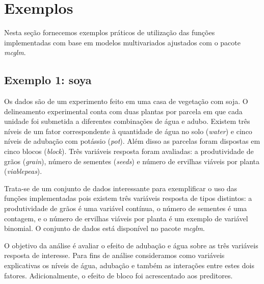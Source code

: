 
\section{Exemplos}

Nesta seção fornecemos exemplos práticos de utilização das funções implementadas com base em modelos multivariados ajustados com o pacote \emph{mcglm}.

\subsection{Exemplo 1: soya}

Os dados são de um experimento feito em uma casa de vegetação com soja. O delineamento experimental conta com duas plantas por parcela em que cada unidade foi submetida a diferentes combinações de água e adubo. Existem três níveis de um fator correspondente à quantidade de água no solo (\emph{water}) e cinco níveis de adubação com potássio (\emph{pot}). Além disso as parcelas foram dispostas em cinco blocos (\emph{block}). Três variáveis resposta foram avaliadas: a produtividade de grãos (\emph{grain}), número de sementes (\emph{seeds}) e número de ervilhas viáveis por planta (\emph{viablepeas}).

Trata-se de um conjunto de dados interessante para exemplificar o uso das funções implementadas pois existem três variáveis resposta de tipos distintos: a produtividade de grãos é uma variável contínua, o número de sementes é uma contagem, e o número de ervilhas viáveis por planta é um exemplo de variável binomial. O conjunto de dados está disponível no pacote \emph{mcglm}.

\begin{knitrout}
\color{fgcolor}\begin{kframe}
\begin{alltt}
\hlstd{(}\hlstd{,}  \hlstd{=} \hlstd{)}
\end{alltt}
\end{kframe}
\end{knitrout}

O objetivo da análise é avaliar o efeito de adubação e água sobre as três variáveis resposta de interesse. Para fins de análise consideramos como variáveis explicativas os níveis de água, adubação e também as interações entre estes dois fatores. Adicionalmente, o efeito de bloco foi acrescentado aos preditores. 

